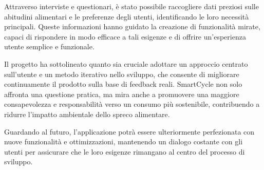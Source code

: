 \documentclass{article}
\begin{document}
Attraverso interviste e questionari, è stato possibile raccogliere dati preziosi sulle abitudini alimentari e le preferenze degli utenti, identificando le loro necessità principali. Queste informazioni hanno guidato la creazione di funzionalità mirate, capaci di rispondere in modo efficace a tali esigenze e di offrire un'esperienza utente semplice e funzionale.

Il progetto ha sottolineato quanto sia cruciale adottare un approccio centrato sull'utente e un metodo iterativo nello sviluppo, che consente di migliorare continuamente il prodotto sulla base di feedback reali. SmartCycle non solo affronta una questione pratica, ma mira anche a promuovere una maggiore consapevolezza e responsabilità verso un consumo più sostenibile, contribuendo a ridurre l'impatto ambientale dello spreco alimentare.

Guardando al futuro, l'applicazione potrà essere ulteriormente perfezionata con nuove funzionalità e ottimizzazioni, mantenendo un dialogo costante con gli utenti per assicurare che le loro esigenze rimangano al centro del processo di sviluppo.
\end{document}
